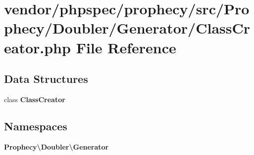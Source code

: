 \section{vendor/phpspec/prophecy/src/\+Prophecy/\+Doubler/\+Generator/\+Class\+Creator.php File Reference}
\label{_class_creator_8php}
\subsection*{Data Structures}
\begin{DoxyCompactItemize}
\item 
class {\bf Class\+Creator}
\end{DoxyCompactItemize}
\subsection*{Namespaces}
\begin{DoxyCompactItemize}
\item 
 {\bf Prophecy\textbackslash{}\+Doubler\textbackslash{}\+Generator}
\end{DoxyCompactItemize}
